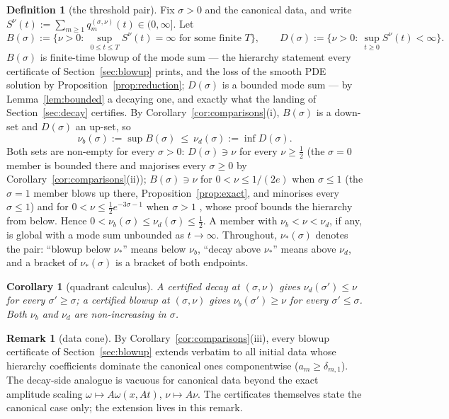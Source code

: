 \documentclass[11pt,a4paper]{article}
\theoremstyle{plain}
\newtheorem{corollary}[theorem]{Corollary}
\theoremstyle{definition}
\newtheorem{definition}[theorem]{Definition}
\newtheorem{remark}[theorem]{Remark}
\begin{document}
\begin{definition}[the threshold pair]\label{def:pair}
Fix $\sigma>0$ and the canonical data, and write $S^\nu(t):=\sum_{m\ge1}q_m^{(\sigma,\nu)}(t)\in(0,\infty]$. Let
\[
B(\sigma):=\{\nu>0:\ \sup_{0\le t\le T}S^\nu(t)=\infty\text{ for some finite }T\},\qquad D(\sigma):=\{\nu>0:\ \sup_{t\ge0}S^\nu(t)<\infty\}.
\]
$B(\sigma)$ is finite-time blowup of the mode sum --- the hierarchy statement every certificate of Section~\ref{sec:blowup} prints, and the loss of the smooth PDE solution by Proposition~\ref{prop:reduction}; $D(\sigma)$ is a bounded mode sum --- by Lemma~\ref{lem:bounded} a decaying one, and exactly what the landing of Section~\ref{sec:decay} certifies. By Corollary~\ref{cor:comparisons}(i), $B(\sigma)$ is a down-set and $D(\sigma)$ an up-set, so
\[
\nu_b(\sigma):=\sup B(\sigma)\ \le\ \nu_d(\sigma):=\inf D(\sigma).
\]
Both sets are non-empty for every $\sigma>0$: $D(\sigma)\ni\nu$ for every $\nu\ge\tfrac12$ (the $\sigma=0$ member is bounded there and majorises every $\sigma\ge0$ by Corollary~\ref{cor:comparisons}(ii)); $B(\sigma)\ni\nu$ for $0<\nu\le1/(2e)$ when $\sigma\le1$ (the $\sigma=1$ member blows up there, Proposition~\ref{prop:exact}, and minorises every $\sigma\le1$) and for $0<\nu\le\tfrac12e^{-3\sigma-1}$ when $\sigma>1$ \cite[Theorem~5]{Sak03b}, whose proof bounds the hierarchy from below. Hence $0<\nu_b(\sigma)\le\nu_d(\sigma)\le\tfrac12$. A member with $\nu_b<\nu<\nu_d$, if any, is global with a mode sum unbounded as $t\to\infty$. Throughout, $\nu_*(\sigma)$ denotes the pair: ``blowup below $\nu_*$'' means below $\nu_b$, ``decay above $\nu_*$'' means above $\nu_d$, and a bracket of $\nu_*(\sigma)$ is a bracket of both endpoints.
\end{definition}

\begin{corollary}[quadrant calculus]\label{cor:quadrant}
A certified decay at $(\sigma,\nu)$ gives $\nu_d(\sigma')\le\nu$ for every $\sigma'\ge\sigma$; a certified blowup at $(\sigma,\nu)$ gives $\nu_b(\sigma')\ge\nu$ for every $\sigma'\le\sigma$. Both $\nu_b$ and $\nu_d$ are non-increasing in $\sigma$.
\end{corollary}

\begin{remark}[data cone]\label{rem:cone}
By Corollary~\ref{cor:comparisons}(iii), every blowup certificate of Section~\ref{sec:blowup} extends verbatim to all initial data whose hierarchy coefficients dominate the canonical ones componentwise ($a_m\ge\delta_{m,1}$). The decay-side analogue is vacuous for canonical data beyond the exact amplitude scaling $\omega\mapsto A\omega(x,At)$, $\nu\mapsto A\nu$. The certificates themselves state the canonical case only; the extension lives in this remark.
\end{remark}
\end{document}
